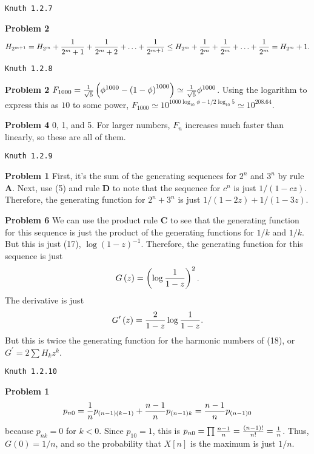 \vskip 0.5in
\centerline{\tt Knuth 1.2.7}
\vskip 0.3in

\noindent
{\bf Problem 2} $$ H_{2^{m+1}} = H_{2^m} + {1 \over 2^m+1 } + {1 \over 2^m + 2 } + \ldots + {1 \over 2^{m+1}}
 \le H_{2^m} + {1 \over 2^m} + {1 \over 2^m} + \ldots + {1\over 2^m} = H_{2^m} + 1. $$

\vskip 0.5in
\centerline{\tt Knuth 1.2.8}
\vskip 0.3in

\noindent
{\bf Problem 2} $F_{1000} = {1 \over \sqrt{5}} \left( \phi^{1000} - \left(1-\phi \right)^{1000} \right) 
 \simeq {1 \over \sqrt{5}} \phi^{1000}$.  Using the logarithm to express this as $10$ to some power, 
  $F_{1000} \simeq 10^{1000 \log_{10} \phi - 1/2 \log_{10} 5} \simeq 10^{208.64}$.

\vskip 0.1in
\noindent
{\bf Problem 4} 0, 1, and 5.  For larger numbers, $F_n$ increases much faster than linearly, so these are
 all of them.
 
\vskip 0.5in
\centerline{\tt Knuth 1.2.9}
\vskip 0.3in

\noindent
{\bf Problem 1} First, it's the sum of the generating sequences for $2^n$ and $3^n$ by rule {\bf A}.  Next,
  use (5) and rule {\bf D} to note that the sequence for $c^n$ is just $1 / \left( 1-c z \right)$.  Therefore, the generating
  function for $2^n + 3^n$ is just $1 / \left( 1 - 2 z \right) + 1 / \left(1 - 3 z\right)$.

\vskip 0.1in
\noindent
{\bf Problem 6} We can use the product rule {\bf C} to see that the generating function for this sequence
 is just the product of the generating functions for $1/k$ and $1/k$.  But this is just (17), $ \log \left(1-z\right)^{-1}$.
 Therefore, the generating function for this sequence is just 
 $$
    G\left(z\right) = \left( \log {1 \over 1 - z} \right)^2.
 $$
 The derivative is just 
 $$
   G^{\prime} \left(z\right) = {2 \over 1-z} \log {1 \over 1-z}.
 $$
 But this is twice the generating function for the harmonic numbers of (18), or
 $G^{\prime} = 2 \sum H_k z^k$.

\vskip 0.5in
\centerline{\tt Knuth 1.2.10}
\vskip 0.3in

\noindent
{\bf Problem 1} 
  $$ 
     p_{n0} = {1 \over n} p_{\left(n-1\right)\left(k-1\right)} + {n-1 \over n} p_{\left(n-1\right) k}
            = {n - 1 \over n} p_{\left(n-1\right) 0}
  $$
  because $p_{nk} = 0$ for $k < 0$.  Since $p_{10} = 1$, this is $p_{n0} = \prod {n - 1 \over n} = 
    {\left(n-1\right)! \over n!} = {1 \over n}$.  Thus, $G\left(0\right) = 1/n$, and so the probability
  that $X\left[n\right]$ is the maximum is just $1/n$.

